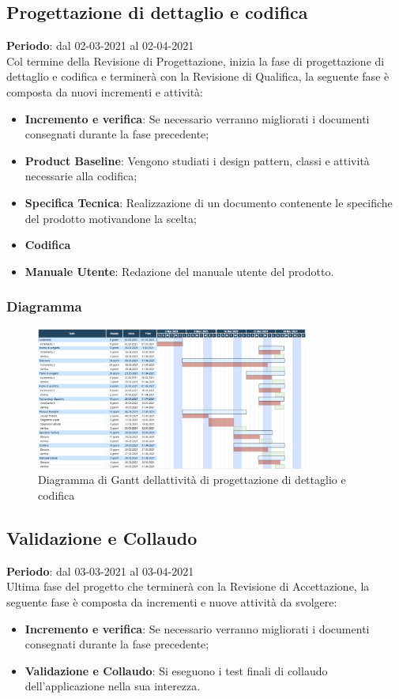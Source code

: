 	\subsection{Progettazione di dettaglio e codifica}
	\textbf{Periodo}: dal 02-03-2021 al 02-04-2021 \\
	Col termine della Revisione di Progettazione, inizia la fase di progettazione di dettaglio e codifica e terminerà con la Revisione di Qualifica, la seguente fase è composta da nuovi incrementi e attività:
	\begin{itemize}
		\item \textbf{Incremento e verifica}: Se necessario verranno migliorati i documenti consegnati durante la fase precedente;
		\item \textbf{Product Baseline}: Vengono studiati i design pattern, classi e attività necessarie alla codifica;
		\item \textbf{Specifica Tecnica}: Realizzazione di un documento contenente le specifiche del prodotto motivandone la scelta;
		\item \textbf{Codifica}
		\item \textbf{Manuale Utente}: Redazione del manuale utente del prodotto.
	\end{itemize}
	
	\subsubsection{Diagramma}
		\begin{figure}[H]
        		\centering
        		\includegraphics[width=0.8\textwidth]{source/img/Progettazionedettaglio_codifica.png}
        		\caption{Diagramma di Gantt dell\textquotesingle attività di progettazione di dettaglio e codifica}
    		\end{figure}

	\subsection{Validazione e Collaudo}
	\textbf{Periodo}: dal 03-03-2021 al 03-04-2021 \\
	Ultima fase del progetto che terminerà con la Revisione di Accettazione, la seguente fase è composta da incrementi e nuove attività da svolgere:
	\begin{itemize}
		\item \textbf{Incremento e verifica}: Se necessario verranno migliorati i documenti consegnati durante la fase precedente;
		\item \textbf{Validazione e Collaudo}: Si eseguono i test finali di collaudo dell'applicazione nella sua interezza.
	\end{itemize}
	
